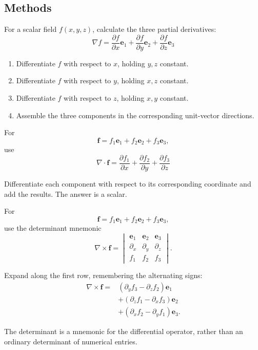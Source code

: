 \subsection{Methods}

\begin{method}
  For a scalar field $f(x,y,z)$, calculate the three partial derivatives:
  \[
  \boxed{
  \nabla f=
  \frac{\partial f}{\partial x}\boldsymbol{e}_1
  +\frac{\partial f}{\partial y}\boldsymbol{e}_2
  +\frac{\partial f}{\partial z}\boldsymbol{e}_3
  }
  \]

  \begin{enumerate}
    \item Differentiate $f$ with respect to $x$, holding $y,z$ constant.
    \item Differentiate $f$ with respect to $y$, holding $x,z$ constant.
    \item Differentiate $f$ with respect to $z$, holding $x,y$ constant.
    \item Assemble the three components in the corresponding unit-vector directions.
  \end{enumerate}
\end{method}

\begin{method}
  For
  \[
  \boldsymbol{f}=f_1\boldsymbol{e}_1
  +f_2\boldsymbol{e}_2+f_3\boldsymbol{e}_3,
  \]
  use
  \[
  \boxed{
  \nabla\cdot\boldsymbol{f}
  =\frac{\partial f_1}{\partial x}
  +\frac{\partial f_2}{\partial y}
  +\frac{\partial f_3}{\partial z}
  }
  \]

  Differentiate each component with respect to its corresponding coordinate and add the results. The answer is a scalar.
\end{method}

\begin{method}
  For
  \[
  \boldsymbol{f}=f_1\boldsymbol{e}_1
  +f_2\boldsymbol{e}_2+f_3\boldsymbol{e}_3,
  \]
  use the determinant mnemonic
  \[
  \nabla\times\boldsymbol{f}
  =
  \begin{vmatrix}
  \boldsymbol{e}_1&\boldsymbol{e}_2&\boldsymbol{e}_3\\
  \partial_x&\partial_y&\partial_z\\
  f_1&f_2&f_3
  \end{vmatrix}.
  \]

  Expand along the first row, remembering the alternating signs:
  \[
  \boxed{
  \begin{aligned}
  \nabla\times\boldsymbol{f}
  ={}&
  (\partial_y f_3-\partial_z f_2)\boldsymbol{e}_1\\
  &+(\partial_z f_1-\partial_x f_3)\boldsymbol{e}_2\\
  &+(\partial_x f_2-\partial_y f_1)\boldsymbol{e}_3.
  \end{aligned}
  }
  \]

  The determinant is a mnemonic for the differential operator, rather than an ordinary determinant of numerical entries.
\end{method}

